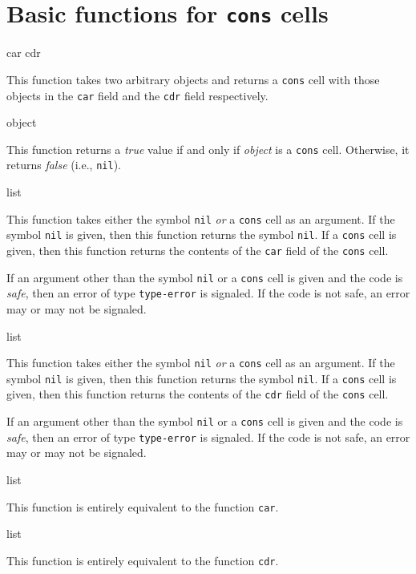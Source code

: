 \chapter{Basic functions for \texttt{cons} cells}
\label{chap-basic-cons-functions}

 {car cdr}

This function takes two arbitrary \lisp{} objects and returns a
\texttt{cons} cell with those objects in the \texttt{car} field and
the \texttt{cdr} field respectively.

 {object}

This function returns a \emph{true} value if and only if
\textit{object} is a \texttt{cons} cell.  Otherwise, it returns
\emph{false} (i.e., \texttt{nil}).

 {list}

This function takes either the symbol \texttt{nil} \emph{or} a
\texttt{cons} cell as an argument.  If the symbol \texttt{nil} is
given, then this function returns the symbol \texttt{nil}.  If a
\texttt{cons} cell is given, then this function returns the contents
of the \texttt{car} field of the \texttt{cons} cell.

If an argument other than the symbol \texttt{nil} or a \texttt{cons}
cell is given and the code is \emph{safe}, then an error of type
\texttt{type-error} is signaled.  If the code is not safe, an error
may or may not be signaled. 

 {list}

This function takes either the symbol \texttt{nil} \emph{or} a
\texttt{cons} cell as an argument.  If the symbol \texttt{nil} is
given, then this function returns the symbol \texttt{nil}.  If a
\texttt{cons} cell is given, then this function returns the contents
of the \texttt{cdr} field of the \texttt{cons} cell.

If an argument other than the symbol \texttt{nil} or a \texttt{cons}
cell is given and the code is \emph{safe}, then an error of type
\texttt{type-error} is signaled.  If the code is not safe, an error
may or may not be signaled.

 {list}

This function is entirely equivalent to the function \texttt{car}.

 {list}

This function is entirely equivalent to the function \texttt{cdr}.

